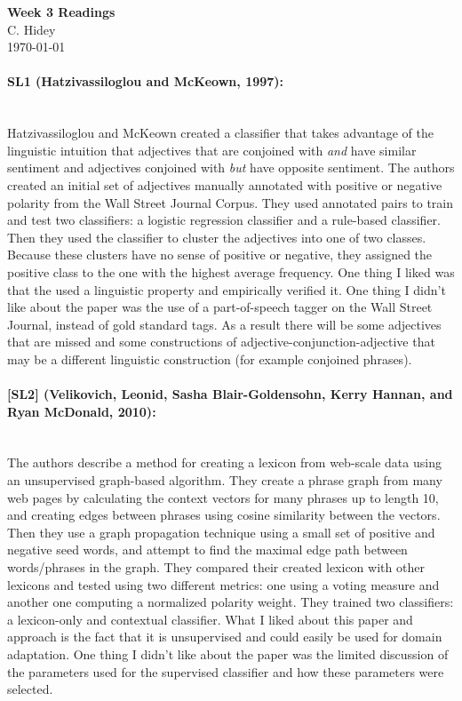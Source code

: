 \documentclass[12pt]{article}
\begin{document}
\begin{center}
  \textbf{Week 3 Readings} \\
  C. Hidey \\
  \today
\end{center}

\paragraph{{\bf SL1 (Hatzivassiloglou and McKeown, 1997):} } 
\text{} \\
Hatzivassiloglou and McKeown created a classifier that takes advantage of the linguistic intuition that adjectives that are conjoined with \textit{and} have similar sentiment and adjectives conjoined with \textit{but} have opposite sentiment. The authors created an initial set of adjectives manually annotated with positive or negative polarity from the Wall Street Journal Corpus.  They used annotated pairs to train and test two classifiers: a logistic regression classifier and a rule-based classifier.  Then they used the classifier to cluster the adjectives into one of two classes.  Because these clusters have no sense of positive or negative, they assigned the positive class to the one with the highest average frequency. One thing I liked was that the used a linguistic property and empirically verified it. One thing I didn't like about the paper was the use of a part-of-speech tagger on the Wall Street Journal, instead of gold standard tags.  As a result there will be some adjectives that are missed and some constructions of adjective-conjunction-adjective that may be a different linguistic construction (for example conjoined phrases).

\paragraph{{\bf [SL2] (Velikovich, Leonid, Sasha Blair-Goldensohn, Kerry Hannan, and Ryan McDonald, 2010): }}  
\text{} \\
The authors describe a method for creating a lexicon from web-scale data using an unsupervised graph-based algorithm. They create a phrase graph from many web pages by calculating the context vectors for many phrases up to length 10, and creating edges between phrases using cosine similarity between the vectors.  Then they use a graph propagation technique using a small set of positive and negative seed words, and attempt to find the maximal edge path between words/phrases in the graph. They compared their created lexicon with other lexicons and tested using two different metrics: one using a voting measure and another one computing a normalized polarity weight.  They trained two classifiers: a lexicon-only and contextual classifier.  What I liked about this paper and approach is the fact that it is unsupervised and could easily be used for domain adaptation.  One thing I didn't like about the paper was the limited discussion of the parameters used for the supervised classifier and how these parameters were selected.
\end{document}
